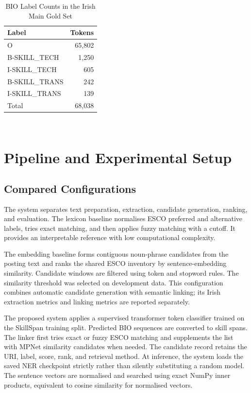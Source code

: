 \documentclass[conference]{IEEEtran}
\begin{document}
\begin{table}[!t]
\caption{BIO Label Counts in the Irish Main Gold Set}
\label{tab:labels}
\centering
\small
\begin{tabular}{lr}
\toprule
Label & Tokens \\
\midrule
\textsf{O} & 65,802 \\
\textsf{B-SKILL\_TECH} & 1,250 \\
\textsf{I-SKILL\_TECH} & 605 \\
\textsf{B-SKILL\_TRANS} & 242 \\
\textsf{I-SKILL\_TRANS} & 139 \\
\midrule
Total & 68,038 \\
\bottomrule
\end{tabular}
\\[1mm]
\par{}
\end{table}

\section{Pipeline and Experimental Setup}
\subsection{Compared Configurations}
The system separates text preparation, extraction, candidate generation, ranking, and evaluation. The lexicon baseline normalises ESCO preferred and alternative labels, tries exact matching, and then applies fuzzy matching with a cutoff. It provides an interpretable reference with low computational complexity.

The embedding baseline forms contiguous noun-phrase candidates from the posting text and ranks the shared ESCO inventory by sentence-embedding similarity. Candidate windows are filtered using token and stopword rules. The similarity threshold was selected on development data. This configuration combines automatic candidate generation with semantic linking; its Irish extraction metrics and linking metrics are reported separately.

The proposed system applies a supervised transformer token classifier trained on the SkillSpan training split. Predicted BIO sequences are converted to skill spans. The linker first tries exact or fuzzy ESCO matching and supplements the list with MPNet similarity candidates when needed. The candidate record retains the URI, label, score, rank, and retrieval method. At inference, the system loads the saved NER checkpoint strictly rather than silently substituting a random model. The sentence vectors are normalised and searched using exact NumPy inner products, equivalent to cosine similarity for normalised vectors.
\end{document}

